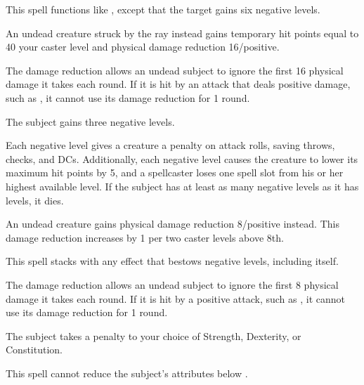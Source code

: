 \begin{spelleffect}
  This spell functions like , except that the target gains six negative levels.
  \par An undead creature struck by the ray instead gains temporary hit points equal to 40 \add your caster level and physical damage reduction 16/positive. 
\end{spelleffect}
\begin{spellnotes}
  The damage reduction allows an undead subject to ignore the first 16 physical damage it takes each round. If it is hit by an attack that deals positive damage, such as , it cannot use its damage reduction for 1 round.
\end{spellnotes}

\spellrng{\rngclose}
\spelldur{\durshort}
\begin{spelleffect}
  The subject gains three negative levels.
  \par Each negative level gives a creature a  penalty on attack rolls, saving throws, checks, and DCs. Additionally, each negative level causes the creature to lower its maximum hit points by 5, and a spellcaster loses one spell slot from his or her highest available level. If the subject has at least as many negative levels as it has levels, it dies.
  \par An undead creature gains physical damage reduction 8/positive instead. This damage reduction increases by 1 per two caster levels above 8th.
\end{spelleffect}
\begin{spellnotes}
  This spell stacks with any effect that bestows negative levels, including itself.

  The damage reduction allows an undead subject to ignore the first 8 physical damage it takes each round. If it is hit by a positive attack, such as , it cannot use its damage reduction for 1 round.
\end{spellnotes}

\spellrng{\rngmed}
\spelldur{\durshort}
\begin{spelleffect}
  The subject takes a  penalty to your choice of Strength, Dexterity, or Constitution.
\end{spelleffect}
\begin{spellnotes}
  This spell cannot reduce the subject's attributes below .
\end{spellnotes}

